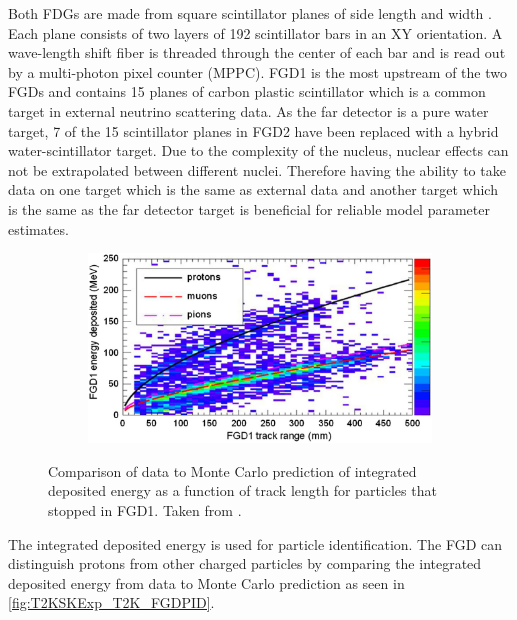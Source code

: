 Both FDGs are made from square scintillator planes of side length  and width . Each plane consists of two layers of 192 scintillator bars in an XY orientation. A wave-length shift fiber is threaded through the center of each bar and is read out by a multi-photon pixel counter (MPPC). FGD1 is the most upstream of the two FGDs and contains 15 planes of carbon plastic scintillator which is a common target in external neutrino scattering data. As the far detector is a pure water target, 7 of the 15 scintillator planes in FGD2 have been replaced with a hybrid water-scintillator target. Due to the complexity of the nucleus, nuclear effects can not be extrapolated between different nuclei. Therefore having the ability to take data on one target which is the same as external data and another target which is the same as the far detector target is beneficial for reliable model parameter estimates.

\begin{figure}[h]
  \begin{subfigure}[t]{0.7\textwidth}
    \includegraphics[width=\textwidth, trim={0mm 0mm 0mm 0mm}, clip,page=1]{Figures/Detectors/T2KFGDPID.pdf}
  \end{subfigure}
  \caption{Comparison of data to Monte Carlo prediction of integrated deposited energy as a function of track length for particles that stopped in FGD1. Taken from \cite{Amaudruz2012}.}
  \label{fig:T2KSKExp_T2K_FGDPID}
\end{figure}

The integrated deposited energy is used for particle identification. The FGD can distinguish protons from other charged particles by comparing the integrated deposited energy from data to Monte Carlo prediction as seen in \autoref{fig:T2KSKExp_T2K_FGDPID}.

